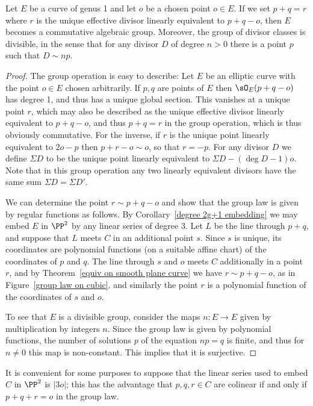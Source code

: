 \begin{proposition}\label{group law} Let $E$ be a curve of genus 1 and let $o$ be a chosen point $o\in E$.
If we set $p+q = r$ where $r$ is the unique effective divisor linearly equivalent to $p+q-o$, then $E$ becomes a
commutative algebraic group.
Moreover, the group of divisor classes is divisible, in the sense that for any divisor $D$ of degree $n>0$
 there is a point $p$ such that $D\sim np$.
 \end{proposition}

\begin{proof}
 The group operation is easy to describe:
Let $E$ be an elliptic curve with the point $o\in E$ chosen arbitrarily. If $p,q$ are points of $E$ then $\sO_E(p+q-o)$ has degree 1, and
thus has a unique global section. This vanishes at a unique point $r$, which may also be described as the unique
effective divisor linearly equivalent to $p+q-o$, and thus 
$p+q = r$ in the group operation, which is thus obviously commutative. For the inverse, if $r$ is the  unique point
linearly equivalent to $2o-p$ then $p+r-o\sim o$, so that $r=-p$. For any divisor $D$
we define $\Sigma D$ to be the unique point linearly equivalent to $\Sigma D-(\deg D-1)o$.
Note that in this group operation any two linearly
equivalent divisors have the same sum $\Sigma D = \Sigma D'$.

We can determine the point $r\sim p+q-o$ and show that the group law is given by regular functions
as follows. By Corollary~\ref{degree 2g+1 embedding} we may embed $E$ in $\PP^2$ by any linear series
of degree 3.  Let $L$ be the line through $p+q$, and suppose that
$L$ meets $C$ in an additional point $s$. Since $s$ is unique, its coordinates are polynomial functions
(on a suitable affine chart) of the coordinates of $p$ and $q$. The line through $s$ and $o$ meets $C$ additionally in a point $r$,
and by Theorem~\ref{equiv on smooth plane curve} we have $r\sim p+q-o$, as in Figure~\ref{group law on cubic}.
and similarly the point $r$ is a polynomial function of the coordinates of $s$ and $o$.

To see that $E$ is a divisible group, consider the maps $n: E\to E$ given by multiplication by integers $n$. Since the
group law is given by polynomial functions, the number of solutions $p$ of the equation $np = q$ is finite, and thus
for $n\neq 0$ this map is non-constant. This implies that it is surjective.
\end{proof}

It is convenient for some purposes to suppose that the linear series used to embed $C$ in $\PP^2$ is $|3o|$; this
has the advantage that $p,q,r\in C$ are colinear if and only if $p+q+r =o$ in the group law.


